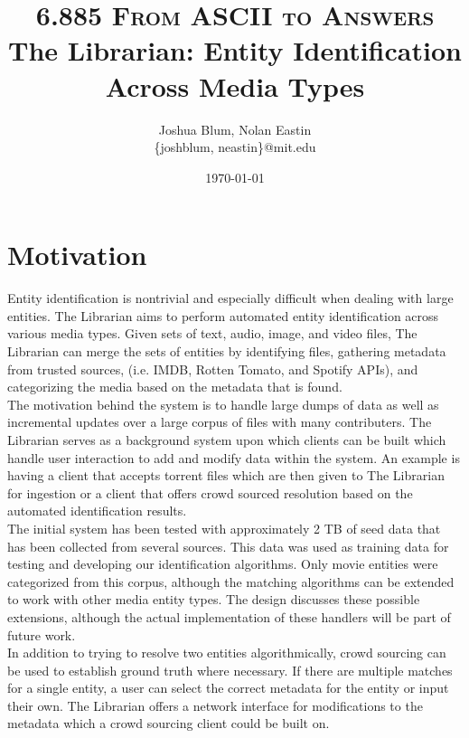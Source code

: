 \documentclass[paper=a4, fontsize=11pt]{scrartcl} %
\title{ 
\normalfont \normalsize 
\textsc{6.885 From ASCII to Answers} %
\horrule{0.5pt} %
\large The Librarian: Entity Identification Across Media Types %
\horrule{1pt} %
}
\author{Joshua Blum, Nolan Eastin \\ \{joshblum, neastin\}@mit.edu}
\date{\normalsize\today} %
\numberwithin{equation}{section} %
\numberwithin{figure}{section} %
\numberwithin{table}{section} %
\begin{document}
\maketitle %

\section{Motivation}
Entity identification is nontrivial and especially difficult when dealing with large entities. The Librarian aims to perform automated entity identification across various media types. Given sets of text, audio, image, and video files, The Librarian can merge the sets of entities by identifying files, gathering metadata from trusted sources, (i.e. IMDB, Rotten Tomato, and Spotify APIs), and categorizing the media based on the metadata that is found. \\

The motivation behind the system is to handle large dumps of data as well as incremental updates over a large corpus of files with many contributers. The Librarian serves as a background system upon which clients can be built which handle user interaction to add and modify data within the system. An example is having a client that accepts torrent files which are then given to The Librarian for ingestion or a client that offers crowd sourced resolution based on the automated identification results.\\

The initial system has been tested with approximately 2 TB of seed data that has been collected from several sources. This data was used as training data for testing and developing our identification algorithms. Only movie entities were categorized from this corpus, although the matching algorithms can be extended to work with other media entity types. The design discusses these possible extensions, although the actual implementation of these handlers will be part of future work.\\

In addition to trying to resolve two entities algorithmically, crowd sourcing can be used to establish ground truth where necessary. If there are multiple matches for a single entity, a user can select the correct metadata for the entity or input their own. The Librarian offers a network interface for modifications to the metadata which a crowd sourcing client could be built on.\\
\end{document}
